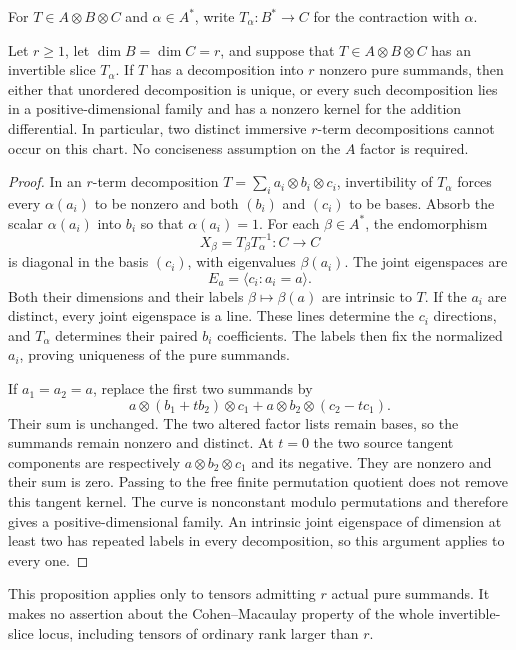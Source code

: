 For $T\in A\otimes B\otimes C$ and $\alpha\in A^*$, write
$T_\alpha:B^*\to C$ for the contraction with $\alpha$.

\begin{proposition}\label{bound:invertible-slice}
Let $r\geq1$, let $\dim B=\dim C=r$, and suppose that
$T\in A\otimes B\otimes C$ has an invertible slice $T_\alpha$.
If $T$ has a decomposition into $r$ nonzero pure summands, then either
that unordered decomposition is unique, or every such decomposition
lies in a positive-dimensional family and has a nonzero kernel for
the addition differential. In particular, two distinct immersive
$r$-term decompositions cannot occur on this chart. No conciseness
assumption on the $A$ factor is required.
\end{proposition}

\begin{proof}
In an $r$-term decomposition $T=\sum_i a_i\otimes b_i\otimes c_i$,
invertibility of $T_\alpha$ forces every $\alpha(a_i)$ to be nonzero
and both $(b_i)$ and $(c_i)$ to be bases. Absorb the scalar
$\alpha(a_i)$ into $b_i$ so that $\alpha(a_i)=1$.
For each $\beta\in A^*$, the endomorphism
\[
 X_\beta=T_\beta T_\alpha^{-1}:C\longrightarrow C
\]
is diagonal in the basis $(c_i)$, with eigenvalues $\beta(a_i)$.
The joint eigenspaces are
\[
 E_a=\langle c_i:a_i=a\rangle.
\]
Both their dimensions and their labels $\beta\mapsto\beta(a)$ are
intrinsic to $T$. If the $a_i$ are distinct, every joint eigenspace
is a line. These lines determine the $c_i$ directions, and
$T_\alpha$ determines their paired $b_i$ coefficients. The labels
then fix the normalized $a_i$, proving uniqueness of the pure summands.

If $a_1=a_2=a$, replace the first two summands by
\[
 a\otimes(b_1+t b_2)\otimes c_1
 +a\otimes b_2\otimes(c_2-t c_1).
\]
Their sum is unchanged. The two altered factor lists remain bases,
so the summands remain nonzero and distinct. At $t=0$ the two
source tangent components are respectively
$a\otimes b_2\otimes c_1$ and its negative. They are nonzero and
their sum is zero. Passing to the free finite permutation quotient
does not remove this tangent kernel. The curve is nonconstant modulo
permutations and therefore gives a positive-dimensional family.
An intrinsic joint eigenspace of dimension at least two has repeated
labels in every decomposition, so this argument applies to every one.
\end{proof}

This proposition applies only to tensors admitting $r$ actual pure
summands. It makes no assertion about the Cohen--Macaulay property of
the whole invertible-slice locus, including tensors of ordinary rank
larger than $r$.


